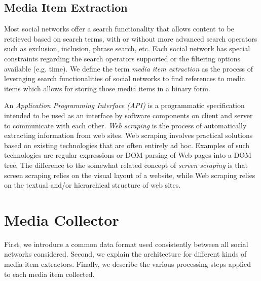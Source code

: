 \documentclass{acm_proc_article-sp}
\let\oldemph\emph
\renewcommand{\emph}[1]{\oldemph{\fontsize{9}{9}\selectfont #1}}
\begin{document}
\subsection{Media Item Extraction}
Most social networks offer a search functionality that allows content to be retrieved based on search terms, with or without more advanced
search operators such as exclusion, inclusion, phrase search, etc. Each social network has special constraints regarding the search operators
supported or the filtering options available (e.g. time). We define the term \emph{media item extraction} as the process of leveraging
search functionalities of social networks to find references to media items which allows for storing those media items in a binary form.

An \emph{Application Programming Interface (API)} is a programmatic specification intended to be used as an interface by software components on client and server to communicate with each other. \emph{Web scraping} is the process of automatically extracting information from web sites. Web scraping involves practical solutions based on existing technologies that are often entirely ad hoc. Examples of such technologies are regular expressions or DOM parsing of Web pages into a DOM tree. The difference to the somewhat related concept of \emph{screen scraping} is that screen scraping relies on the visual layout of a website, while Web scraping relies on the textual and/or hierarchical structure of web sites.

\section{Media Collector}                                                   \label{sec:media-collector}
First, we introduce a common data format used consistently between all social networks considered.
Second, we explain the architecture for different kinds of media item extractors. Finally,
we describe the various processing steps applied to each media item collected.
\end{document}
